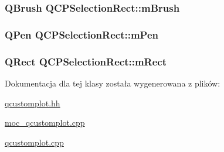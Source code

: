 \subsubsection[{\texorpdfstring{m\+Brush}{mBrush}}]{\setlength{\rightskip}{0pt plus 5cm}Q\+Brush Q\+C\+P\+Selection\+Rect\+::m\+Brush\hspace{0.3cm}{\ttfamily [protected]}}\hypertarget{class_q_c_p_selection_rect_a1bda3f02c2e4da58c856d19695028cbe}{}\label{class_q_c_p_selection_rect_a1bda3f02c2e4da58c856d19695028cbe}
\subsubsection[{\texorpdfstring{m\+Pen}{mPen}}]{\setlength{\rightskip}{0pt plus 5cm}Q\+Pen Q\+C\+P\+Selection\+Rect\+::m\+Pen\hspace{0.3cm}{\ttfamily [protected]}}\hypertarget{class_q_c_p_selection_rect_ae255dec12cd531071115bd667f0fd815}{}\label{class_q_c_p_selection_rect_ae255dec12cd531071115bd667f0fd815}
\subsubsection[{\texorpdfstring{m\+Rect}{mRect}}]{\setlength{\rightskip}{0pt plus 5cm}Q\+Rect Q\+C\+P\+Selection\+Rect\+::m\+Rect\hspace{0.3cm}{\ttfamily [protected]}}\hypertarget{class_q_c_p_selection_rect_a45a2600ef19c8f7b5ec6134beab036cf}{}\label{class_q_c_p_selection_rect_a45a2600ef19c8f7b5ec6134beab036cf}


Dokumentacja dla tej klasy została wygenerowana z plików\+:\begin{DoxyCompactItemize}
\item 
\hyperlink{qcustomplot_8hh}{qcustomplot.\+hh}\item 
\hyperlink{moc__qcustomplot_8cpp}{moc\+\_\+qcustomplot.\+cpp}\item 
\hyperlink{qcustomplot_8cpp}{qcustomplot.\+cpp}\end{DoxyCompactItemize}
